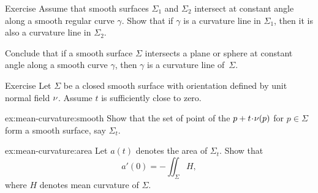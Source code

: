 \begin{thm}{Exercise}\label{ex:shape-curvature-line}
Assume that smooth surfaces $\Sigma_1$ and $\Sigma_2$ intersect at constant angle along a smooth regular curve $\gamma$.
Show that if $\gamma$ is a curvature line in $\Sigma_1$, then it is also a curvature line in $\Sigma_2$.

Conclude that if a smooth surface $\Sigma$ intersects a plane or sphere at constant angle along a smooth curve $\gamma$,
then $\gamma$ is a curvature line of~$\Sigma$.
\end{thm}

\begin{thm}{Exercise}\label{ex:mean-curvature}
Let $\Sigma$ be a closed smooth surface with orientation defined by unit normal field $\nu$.
Assume $t$ is sufficiently close to zero.

\begin{subthm}{ex:mean-curvature:smooth}
Show that the set of point of the $p+t\cdot \Norm(p)$ for $p\in\Sigma$ form a smooth surface, say $\Sigma_t$.
\end{subthm}

\begin{subthm}{ex:mean-curvature:area}
Let $a(t)$ denotes the area of $\Sigma_t$.
Show that 
\[a'(0)=-\iint_\Sigma H,\]
where $H$ denotes mean curvature of $\Sigma$.
\end{subthm}



\end{thm}

